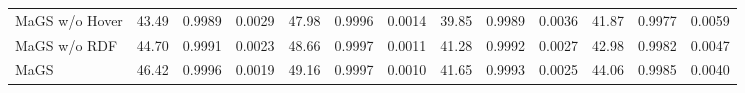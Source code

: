 \begin{table}[]
{\begin{tabular}{@{}lcccccccccccc@{}}
MaGS w/o Hover & 43.49 & 0.9989 & 0.0029 & \cellcolor[HTML]{FFFF8F}47.98 & \cellcolor[HTML]{FFFF8F}0.9996 & \cellcolor[HTML]{FFFF8F}0.0014 & \cellcolor[HTML]{FFFF8F}39.85 & \cellcolor[HTML]{FFFF8F}0.9989 & \cellcolor[HTML]{FFFF8F}0.0036 & \cellcolor[HTML]{FFFF8F}41.87 & \cellcolor[HTML]{FFFF8F}0.9977 & \cellcolor[HTML]{FFFF8F}0.0059 \\
MaGS w/o RDF & \cellcolor[HTML]{FAC791}44.70 & \cellcolor[HTML]{FAC791}0.9991 & \cellcolor[HTML]{FAC791}0.0023 & \cellcolor[HTML]{FAC791}48.66 & \cellcolor[HTML]{F59194}0.9997 & \cellcolor[HTML]{FAC791}0.0011 & \cellcolor[HTML]{FAC791}41.28 & \cellcolor[HTML]{FAC791}0.9992 & \cellcolor[HTML]{FAC791}0.0027 & \cellcolor[HTML]{FAC791}42.98 & \cellcolor[HTML]{FAC791}0.9982 & \cellcolor[HTML]{FAC791}0.0047 \\
MaGS & \cellcolor[HTML]{F59194}46.42 & \cellcolor[HTML]{F59194}0.9996 & \cellcolor[HTML]{F59194}0.0019 & \cellcolor[HTML]{F59194}49.16 & \cellcolor[HTML]{F59194}0.9997 & \cellcolor[HTML]{F59194}0.0010 & \cellcolor[HTML]{F59194}41.65 & \cellcolor[HTML]{F59194}0.9993 & \cellcolor[HTML]{F59194}0.0025 & \cellcolor[HTML]{F59194}44.06 & \cellcolor[HTML]{F59194}0.9985 & \cellcolor[HTML]{F59194}0.0040 \\ \bottomrule
\end{tabular}%
}
\end{table}
